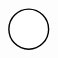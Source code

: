 \documentclass[10pt]{article}
\theoremstyle{plain}
\theoremstyle{remark}
\begin{document}
\[\begin{pgfpicture}
\begin{pgfscope}
\pgfpathcurveto{\pgfqpoint{0.398474in}{2.279834in}}{\pgfqpoint{0.348509in}{2.300529in}}{\pgfqpoint{0.296419in}{2.300529in}}%
\pgfpathcurveto{\pgfqpoint{0.244328in}{2.300529in}}{\pgfqpoint{0.194363in}{2.279834in}}{\pgfqpoint{0.157530in}{2.243000in}}%
\pgfpathcurveto{\pgfqpoint{0.120696in}{2.206166in}}{\pgfqpoint{0.100000in}{2.156202in}}{\pgfqpoint{0.100000in}{2.104111in}}%
\pgfpathcurveto{\pgfqpoint{0.100000in}{2.052020in}}{\pgfqpoint{0.120696in}{2.002056in}}{\pgfqpoint{0.157530in}{1.965222in}}%
\pgfpathcurveto{\pgfqpoint{0.194363in}{1.928388in}}{\pgfqpoint{0.244328in}{1.907692in}}{\pgfqpoint{0.296419in}{1.907692in}}%
\pgfpathclose%
\pgfusepath{stroke,fill}%
\end{pgfscope}%
\begin{pgfscope}%
\pgfsetbuttcap%
\pgfsetroundjoin%
\definecolor{currentfill}{rgb}{1.000000,1.000000,1.000000}%
\pgfsetfillcolor{currentfill}%
\pgfsetlinewidth{1.003750pt}%
\definecolor{currentstroke}{rgb}{0.000000,0.000000,0.000000}%
\pgfsetstrokecolor{currentstroke}%
\pgfsetdash{}{0pt}%
\pgfpathmoveto{\pgfqpoint{3.906542in}{1.907692in}}%
\pgfpathcurveto{\pgfqpoint{3.958633in}{1.907692in}}{\pgfqpoint{4.008597in}{1.928388in}}{\pgfqpoint{4.045431in}{1.965222in}}%
\pgfpathcurveto{\pgfqpoint{4.082265in}{2.002056in}}{\pgfqpoint{4.102961in}{2.052020in}}{\pgfqpoint{4.102961in}{2.104111in}}%
\pgfpathcurveto{\pgfqpoint{4.102961in}{2.156202in}}{\pgfqpoint{4.082265in}{2.206166in}}{\pgfqpoint{4.045431in}{2.243000in}}%
\pgfpathcurveto{\pgfqpoint{4.008597in}{2.279834in}}{\pgfqpoint{3.958633in}{2.300529in}}{\pgfqpoint{3.906542in}{2.300529in}}%
\pgfpathcurveto{\pgfqpoint{3.854451in}{2.300529in}}{\pgfqpoint{3.804487in}{2.279834in}}{\pgfqpoint{3.767653in}{2.243000in}}%
\pgfpathcurveto{\pgfqpoint{3.730819in}{2.206166in}}{\pgfqpoint{3.710124in}{2.156202in}}{\pgfqpoint{3.710124in}{2.104111in}}%
\pgfpathcurveto{\pgfqpoint{3.710124in}{2.052020in}}{\pgfqpoint{3.730819in}{2.002056in}}{\pgfqpoint{3.767653in}{1.965222in}}%
\pgfpathcurveto{\pgfqpoint{3.804487in}{1.928388in}}{\pgfqpoint{3.854451in}{1.907692in}}{\pgfqpoint{3.906542in}{1.907692in}}%
\pgfpathclose%
\pgfusepath{stroke,fill}%
\end{pgfscope}%
\begin{pgfscope}%
\pgfsetbuttcap%
\pgfsetroundjoin%
\definecolor{currentfill}{rgb}{1.000000,1.000000,1.000000}%
\pgfsetfillcolor{currentfill}%
\pgfsetlinewidth{1.003750pt}%
\definecolor{currentstroke}{rgb}{0.000000,0.000000,0.000000}%
\pgfsetstrokecolor{currentstroke}%
\pgfsetdash{}{0pt}%
\pgfpathmoveto{\pgfqpoint{3.019108in}{1.907692in}}%
\pgfpathcurveto{\pgfqpoint{3.071199in}{1.907692in}}{\pgfqpoint{3.121164in}{1.928388in}}{\pgfqpoint{3.157997in}{1.965222in}}%

\end{pgfscope}
\end{pgfpicture}\]
\end{document}
